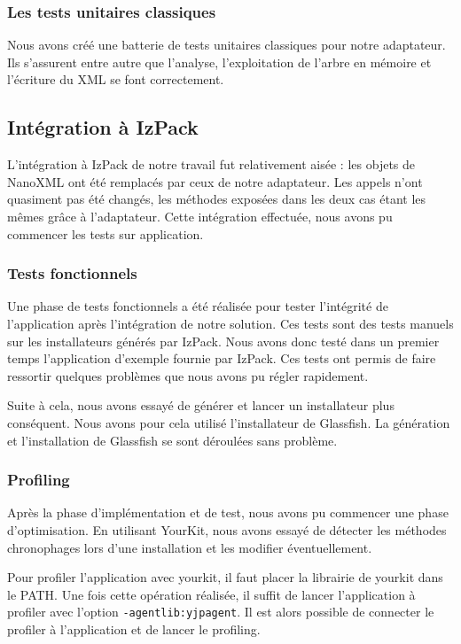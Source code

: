 \subsubsection{Les tests unitaires classiques}
Nous avons créé une batterie de tests unitaires classiques pour notre adaptateur.
Ils s'assurent entre autre que l'analyse, l'exploitation de l'arbre en mémoire et l'écriture du XML se font correctement.

\subsection{Intégration à IzPack}
L'intégration à IzPack de notre travail fut relativement aisée : les objets de NanoXML ont été remplacés par ceux de notre adaptateur.
Les appels n'ont quasiment pas été changés, les méthodes exposées dans les deux cas étant les mêmes grâce à l'adaptateur.
Cette intégration effectuée, nous avons pu commencer les tests sur application.
\subsubsection{Tests fonctionnels}
Une phase de tests fonctionnels a été réalisée pour tester l'intégrité de l'application après l'intégration de notre solution.
Ces tests sont des tests manuels sur les installateurs générés par IzPack.
Nous avons donc testé dans un premier temps l'application d'exemple fournie par IzPack.
Ces tests ont permis de faire ressortir quelques problèmes que nous avons pu régler rapidement.

Suite à cela, nous avons essayé de générer et lancer un installateur plus conséquent.
Nous avons pour cela utilisé l'installateur de Glassfish.
La génération et l'installation de Glassfish se sont déroulées sans problème.
\subsubsection{Profiling}
Après la phase d'implémentation et de test, nous avons pu commencer une phase d'optimisation.
En utilisant YourKit, nous avons essayé de détecter les méthodes chronophages lors d'une installation et les modifier éventuellement.

Pour profiler l'application avec yourkit, il faut placer la librairie de yourkit dans le PATH.
Une fois cette opération réalisée, il suffit de lancer l'application à profiler avec l'option \verb|-agentlib:yjpagent|.
Il est alors possible de connecter le profiler à l'application et de lancer le profiling.

